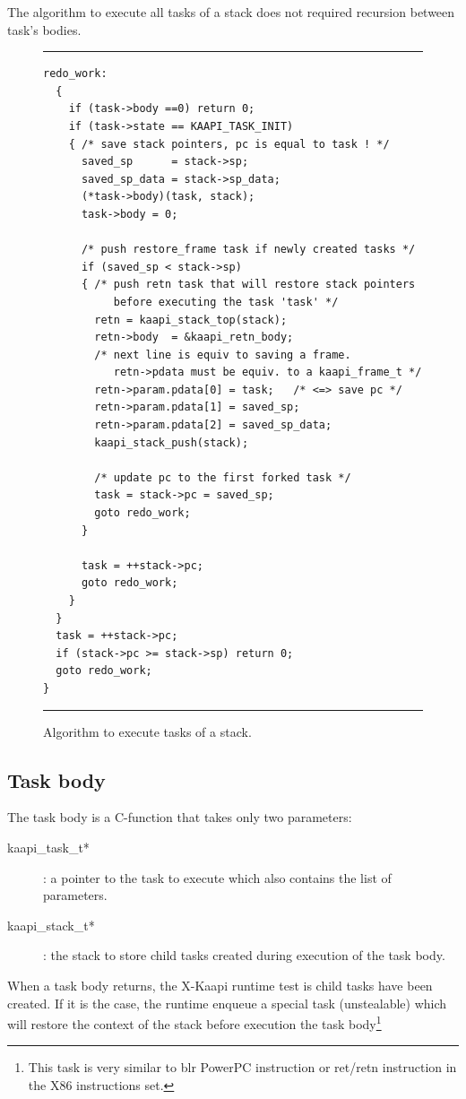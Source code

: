 \documentclass{report}
\newcommand{\kaapi}{\textsc{X}-Kaapi\xspace}
\begin{document}
The algorithm to execute all tasks of a stack does not required recursion between task's bodies. 
\begin{figure}
\hrule
{\small
\begin{verbatim}
redo_work: 
  {
    if (task->body ==0) return 0;
    if (task->state == KAAPI_TASK_INIT) 
    { /* save stack pointers, pc is equal to task ! */
      saved_sp      = stack->sp;
      saved_sp_data = stack->sp_data;
      (*task->body)(task, stack);
      task->body = 0;
    
      /* push restore_frame task if newly created tasks */
      if (saved_sp < stack->sp) 
      { /* push retn task that will restore stack pointers 
           before executing the task 'task' */
        retn = kaapi_stack_top(stack);
        retn->body  = &kaapi_retn_body;
        /* next line is equiv to saving a frame. 
           retn->pdata must be equiv. to a kaapi_frame_t */
        retn->param.pdata[0] = task;   /* <=> save pc */
        retn->param.pdata[1] = saved_sp; 
        retn->param.pdata[2] = saved_sp_data;
        kaapi_stack_push(stack);

        /* update pc to the first forked task */
        task = stack->pc = saved_sp;
        goto redo_work;
      }
       
      task = ++stack->pc;
      goto redo_work;
    }
  }
  task = ++stack->pc;
  if (stack->pc >= stack->sp) return 0;
  goto redo_work;
}
\end{verbatim}
}
\hrule
\caption{Algorithm to execute tasks of a stack.}
\label{fig:stackalgo}
\end{figure}

\subsection{Task body}

The task body is a C-function that takes only two parameters:
\begin{description}
\item [kaapi\_task\_t*]: a pointer to the task to execute which also contains the list of parameters.
\item [kaapi\_stack\_t*]: the stack to store child  tasks created during execution of the task body.
\end{description}

When a task body returns, the \kaapi runtime test is child tasks have been created.
If it is the case, the runtime enqueue a special task (unstealable) which will restore the
context of the stack before execution the task body\footnote{This task is very similar to blr PowerPC instruction or ret/retn instruction in the X86 instructions set.}
\end{document}

